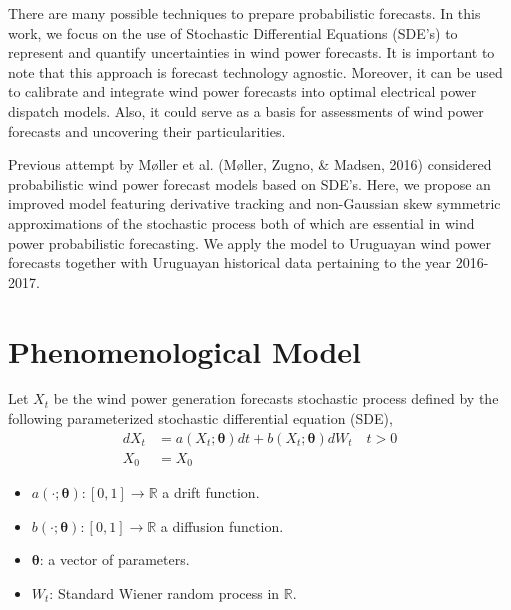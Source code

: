 \documentclass[10pt,twocolumn,letterpaper]{article}
\newcommand{\R}{\mathbb{R}}
\begin{document}
	There are many possible techniques to prepare probabilistic forecasts.  In this work, we focus on the use of Stochastic Differential Equations (SDE's) to represent and quantify uncertainties in wind power forecasts. It is important to note that this approach is  forecast technology agnostic. Moreover, it can be used to calibrate and integrate wind power forecasts into optimal electrical power dispatch models. Also, it could serve as a basis for assessments of wind power forecasts  and uncovering their particularities.

Previous attempt by M\o ller et al. (M\o ller, Zugno, \& Madsen, 2016)  considered probabilistic wind power forecast models based on SDE's. Here, we propose an improved model featuring derivative tracking and  non-Gaussian skew symmetric approximations of the stochastic process both of which are essential in wind power probabilistic forecasting. We apply the model to Uruguayan wind power forecasts together with Uruguayan historical data  pertaining to the year 2016-2017.

\section{Phenomenological  Model}

Let $X_t$ be the  wind power generation forecasts stochastic process defined by the  following parameterized stochastic differential equation (SDE), 
\begin{equation}
\begin{split}
dX_t &= a(X_t; \bm{\theta}) dt + b (X_t; \bm{\theta} ) dW_t \quad t > 0 \\
X_0 & = X_0
\end{split}
\label{main}
\end{equation}

\begin{itemize}
\item $a(\cdot; \bm{\theta}):[0,1] \to \R $  a drift function.
\item $b (\cdot; \bm{\theta} ):[0,1] \to \R$  a  diffusion function.
\item $\bm{\theta}$: a vector of parameters.
\item $W_t$: Standard Wiener random process in $\R$.
\end{itemize}
\end{document}
